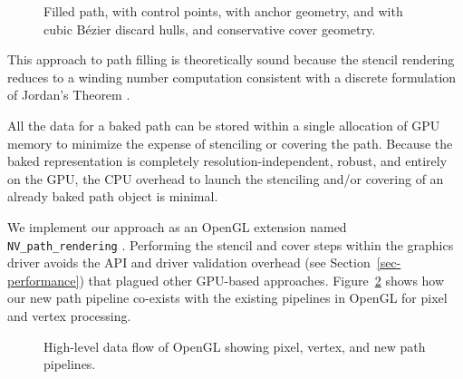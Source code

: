 \begin{figure}[tb]
  \caption{\label{fig:filling-explained} Filled path, with control
  points, with anchor geometry, and with cubic B\'{e}zier discard hulls,
  and conservative cover geometry.}
\end{figure}
 
This approach to path filling is theoretically sound because the stencil
rendering reduces to a winding number computation consistent with a discrete
formulation of Jordan's Theorem \cite{625138}.

All the data for a baked path can be stored within a single allocation of
GPU memory to minimize the expense of stenciling or covering the path.
Because the baked representation is completely resolution-independent,
robust, and entirely on the GPU, the CPU overhead to launch the stenciling
and/or covering of an already baked path object is minimal.


We implement our approach as an OpenGL extension named {\tt
NV\_path\_rendering} \cite{NVpr}.  Performing the stencil and cover steps
within the graphics driver avoids
the API and driver validation overhead (see
Section~\ref{sec-performance}) that plagued other GPU-based approaches.
Figure~\ref{fig:pipelines}
shows how our new path pipeline co-exists with the existing pipelines
in OpenGL for pixel and vertex processing.

\begin{figure}[tb]
  \caption{\label{fig:pipelines} High-level data flow of OpenGL showing
  pixel, vertex, and new path pipelines.}
\end{figure}
 
